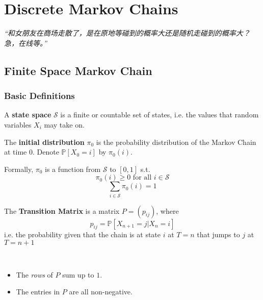 \chapter{Discrete Markov Chains}
\emph{“和女朋友在商场走散了，是在原地等碰到的概率大还是随机走碰到的概率大？急，在线等。”}
\newpage


\section{Finite Space Markov Chain}

    \subsection{Basic Definitions}
    \begin{definition}
        A \textbf{state space} $\mathcal{S}$ is a finite or countable set of states, i.e. the values that random variables $X_i$ may take on.
    \end{definition}
    \begin{definition}
        The \textbf{initial distribution} $\pi_0$ is the probability distribution of the Markov Chain at time $0$. Denote $\mathbb{P}[X_0 = i]$ by $\pi_0(i)$.
    \end{definition}
    \begin{remark}
        Formally, $\pi_0$ is a function from $\mathcal{S}$ to $[0,1]$ s.t.
        \[ \pi_0(i) \ge 0 \text{ for all $i\in\mathcal{S}$} \]
        \[ \sum_{i\in\mathcal{S}} \pi_0(i) = 1\]
    \end{remark}
    \begin{definition}
        The \textbf{Transition Matrix} is a matrix $P = (p_{ij})$, where
        \[ p_{ij} = \mathbb{P}[X_{n+1} = j | X_n = i] \]
        i.e. the probability given that the chain is at state $i$ at $T=n$ that jumps to $j$ at $T=n+1$
    \end{definition}
    \begin{remark}
        ~{}
        \begin{itemize}
            \item The \emph{rows} of $P$ sum up to $1$.
            \item The entries in $P$ are all non-negative.
        \end{itemize}
    \end{remark}


